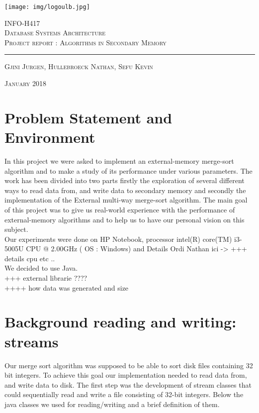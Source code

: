 \documentclass{article}
\begin{document}
    \begin{titlepage}
        \begin{center}
            \texttt{[image: img/logoulb.jpg]}
        \end{center}
        \center
        \vspace{2cm}
        \textsc{\large INFO-H417} \\[0.5cm]
        \textsc{\LARGE Database Systems Architecture} \\[1.5cm]

        \textsc{\Large Project report : Algorithms in Secondary Memory} %

        \rule{\textwidth}{1pt}

        \vspace{2cm}

        \textsc{\large Gjini Jurgen, Hullebroeck Nathan, Sefu Kevin}

        \vspace{1cm}
        \textsc{January 2018}

    \end{titlepage}
    \newpage

    \section{Problem Statement and Environment}
    In this project we were asked to implement an external-memory merge-sort algorithm and to make a study of its performance under various parameters. The work has been divided into two parts firstly the exploration of several different ways to read data from, and write data to secondary memory and secondly the implementation of the External multi-way merge-sort algorithm. The main goal of this project was to give us real-world experience with the performance of external-memory algorithms and to help us to have our personal vision on this subject.\\
    Our experiments were done on HP Notebook,  processor intel(R) core(TM) i3-5005U CPU @ 2.00GHz ( OS : Windows) and Details Ordi Nathan ici ->  +++ details cpu etc ..\\
    We decided to use Java.\\
    +++ external librarie ????\\
    ++++ how data was generated and size



    \section{Background reading and writing: streams}
    Our merge sort algorithm was supposed to be able to sort disk files containing 32 bit integers. To achieve this goal our implementation needed to read data from, and write data to disk. The first step was the development of stream classes that could sequentially read and write a ﬁle consisting of 32-bit integers. Below the java classes we used for reading/writing and a brief definition of them.
\end{document}
